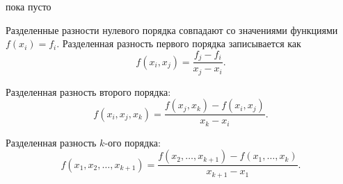 \begin{col-answer-preambule}
	\begin{plan}
    \item пока пусто
	\end{plan}
\end{col-answer-preambule}


Разделенные разности нулевого порядка совпадают со значениями функциями $f(x_i) = f_i$. Разделенная разность первого порядка записывается как
\begin{equation*}
  f(x_i, x_j) = \dfrac{f_j - f_i}{x_j - x_i}.
\end{equation*}

Разделенная разность второго порядка:
\begin{equation*}
  f(x_i, x_j, x_k) = \dfrac{f(x_j, x_k) - f(x_i, x_j)}{x_k - x_i}.
\end{equation*}

Разделенная разность $k$-ого порядка:
\begin{equation*}
  f(x_1, x_2, \ldots, x_{k+1}) = \dfrac{f(x_2, \ldots, x_{k+1}) - f(x_1, \ldots, x_k)}{x_{k+1} - x_1}.
\end{equation*}

